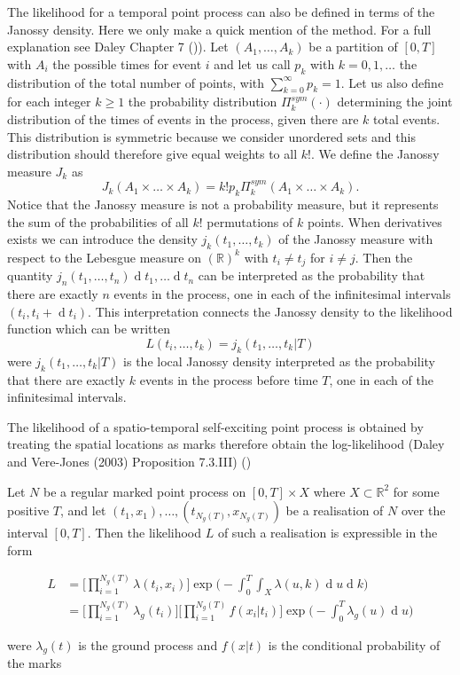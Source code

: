 \documentclass[11pt,a4paper]{article}
\renewcommand{\d}[1]{\ensuremath{\operatorname{d}\!{#1}}}
\begin{document}
The likelihood for a temporal point process can also be defined in terms of the Janossy density. Here we only make a quick mention of the method. For a full explanation see Daley Chapter 7 (\cite{Daley})).
Let $(A_1, \dots, A_k)$ be a partition of $[0, T]$ with $A_i$ the possible times for event $i$ and let us call $p_k$ with $k = 0, 1, \dots$ the distribution of the total number of points, with $\sum_{k=0}^\infty p_k = 1$. Let us also define for each integer $k \geq 1$ the probability distribution $\Pi_k^{sym}(\cdot)$ determining the joint distribution of the times of events in the process, given there are $k$ total events. This distribution is symmetric because we consider unordered sets and this distribution should therefore give equal weights to all $k!$. We define the Janossy measure $J_k$ as
\begin{equation*}
    J_k(A_1 \times \dots \times A_k) = k!p_k\Pi_k^{sym}(A_1 \times \dots \times A_k).
\end{equation*}
Notice that the Janossy measure is not a probability measure, but it represents the sum of the probabilities of all $k!$ permutations of $k$ points. 
When derivatives exists we can introduce the density $j_k(t_1, \dots, t_k)$ of the Janossy measure with respect to the Lebesgue measure on $(\mathbb{R})^k$ with $t_i \neq t_j$ for $i \neq j$. Then the quantity $j_n(t_1, \dots, t_n)\d t_1, \dots \d t_n$ can be interpreted as the probability that there are exactly $n$ events in the process, one in each of the infinitesimal intervals $(t_i, t_i+\d t_i)$. This interpretation connects the Janossy density to the likelihood function which can be written
\begin{equation*}
    L(t_i,\dots, t_k) = j_k(t_1, \dots, t_k | T)
\end{equation*}
were $j_k(t_1, \dots, t_k | T)$ is the local Janossy density interpreted as the probability that there are exactly $k$ events in the process before time $T$, one in each of the infinitesimal intervals.

The likelihood of a spatio-temporal self-exciting point process is obtained by treating the spatial locations as marks therefore obtain the log-likelihood (Daley and Vere-Jones (2003) Proposition 7.3.III) (\cite{Daley})

\begin{proposition}
    Let $N$ be a regular marked point process on $[0, T] \times X$ where $X \subset \mathbb{R}^2$ for some positive $T$, and let $(t_1, x_1), \dots, (t_{N_g(T)}, x_{N_g(T)})$ be a realisation of $N$ over the interval $[0, T]$. Then the likelihood $L$ of such a realisation is expressible  in the form
    
    \begin{align*}
        L &= \Bigg[ \prod_{i=1}^{N_g(T)} \lambda(t_i, x_i) \Bigg]\exp \Bigg( -\int_{0}^{T} \int_X \lambda(u, k) \d u \d k \Bigg) \\
        &= \Bigg[ \prod_{i=1}^{N_g(T)} \lambda_g(t_i) \Bigg] \Bigg[ \prod_{i=1}^{N_g(T)} f(x_i | t_i) \Bigg]\exp \Bigg( -\int_{0}^{T} \lambda_g(u) \d u \Bigg)
    \end{align*}
\end{proposition}
were $\lambda_g(t)$ is the ground process and $f(x | t)$ is the conditional probability of the marks 
\end{document}
